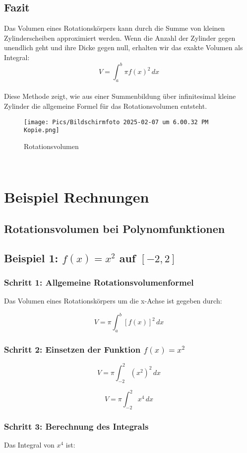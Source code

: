 \documentclass[a4paper,final]{report}
\begin{document}
\section{Fazit}

Das Volumen eines Rotationskörpers kann durch die Summe von kleinen Zylinderscheiben approximiert werden. Wenn die Anzahl der Zylinder gegen unendlich geht und ihre Dicke gegen null, erhalten wir das exakte Volumen als Integral:
\\
\[
V = \int_a^b \pi f(x)^2 \, dx
\]
\\
Diese Methode zeigt, wie aus einer Summenbildung über infinitesimal kleine Zylinder die allgemeine Formel für das Rotationsvolumen entsteht.
\begin{figure}[h]
    \centering
    \texttt{[image: Pics/Bildschirmfoto 2025-02-07 um 6.00.32 PM Kopie.png]}
    \caption{Rotationsvolumen}
    \label{fig:enter-label}
\end{figure}
\\
\cite{lambacher_schweizer}

\chapter{Beispiel Rechnungen}

\section{Rotationsvolumen bei Polynomfunktionen}
\section{Beispiel 1: \( f(x) = x^2 \) auf \( [-2,2] \)}

\subsection{Schritt 1: Allgemeine Rotationsvolumenformel}
Das Volumen eines Rotationskörpers um die x-Achse ist gegeben durch:

\[
V = \pi \int_a^b [f(x)]^2 \, dx
\]

\subsection{Schritt 2: Einsetzen der Funktion \( f(x) = x^2 \)}
\[
V = \pi \int_{-2}^{2} (x^2)^2 \, dx
\]

\[
V = \pi \int_{-2}^{2} x^4 \, dx
\]

\subsection{Schritt 3: Berechnung des Integrals}
Das Integral von \( x^4 \) ist:
\end{document}
